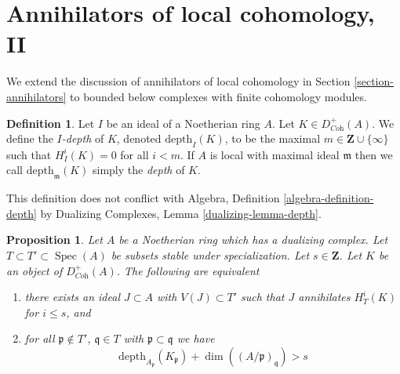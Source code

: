 \documentclass{stacks-project}
\theoremstyle{plain}
\newtheorem{proposition}[subsection]{Proposition}
\theoremstyle{definition}
\newtheorem{definition}[subsection]{Definition}
\theoremstyle{remark}
\numberwithin{equation}{subsection}
\def\Spec{\mathop{\mathrm{Spec}}}
\begin{document}
\section{Annihilators of local cohomology, II}
\label{section-annihilators-II}

\noindent
We extend the discussion of annihilators of local cohomology in
Section \ref{section-annihilators}
to bounded below complexes with finite cohomology modules.

\begin{definition}
\label{definition-depth-complex}
Let $I$ be an ideal of a Noetherian ring $A$. Let
$K \in D^+_{\textit{Coh}}(A)$. We define the {\it $I$-depth} of $K$,
denoted $\text{depth}_I(K)$, to be the maximal
$m \in \mathbf{Z} \cup \{\infty\}$ such that $H^i_I(K) = 0$ for all $i < m$.
If $A$ is local with maximal ideal $\mathfrak m$
then we call $\text{depth}_\mathfrak m(K)$ simply the {\it depth} of $K$.
\end{definition}

\noindent
This definition does not conflict with
Algebra, Definition \ref{algebra-definition-depth}
by Dualizing Complexes, Lemma \ref{dualizing-lemma-depth}.

\begin{proposition}
\label{proposition-annihilator-complex}
Let $A$ be a Noetherian ring which has a dualizing complex.
Let $T \subset T' \subset \Spec(A)$ be subsets stable under
specialization. Let $s \in \mathbf{Z}$. Let $K$ be an object of
$D_{\textit{Coh}}^+(A)$. The following are equivalent
\begin{enumerate}
\item there exists an ideal $J \subset A$ with $V(J) \subset T'$
such that $J$ annihilates $H^i_T(K)$ for $i \leq s$, and
\item for all $\mathfrak p \not \in T'$,
$\mathfrak q \in T$ with $\mathfrak p \subset \mathfrak q$
we have
$$
\text{depth}_{A_\mathfrak p}(K_\mathfrak p) +
\dim((A/\mathfrak p)_\mathfrak q) > s
$$
\end{enumerate}
\end{proposition}
\end{document}
